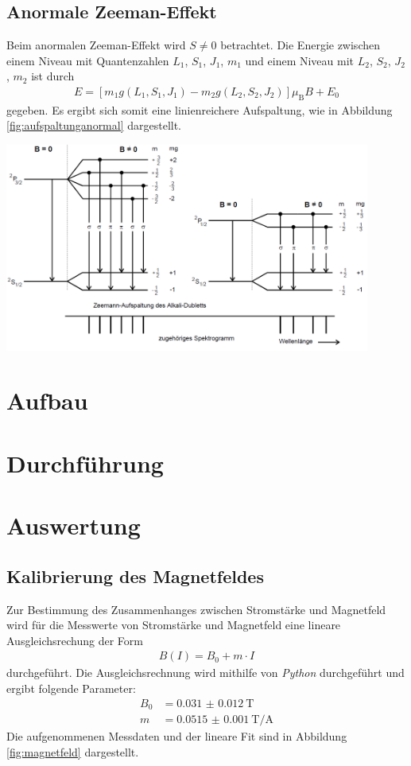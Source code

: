 \documentclass[captions=tableheading]{scrartcl}
\newcommand{\indx}[1]{\text{#1}}
\begin{document}
\subsection{Anormale Zeeman-Effekt}
Beim anormalen Zeeman-Effekt wird $S\neq 0$ betrachtet. 
Die Energie zwischen einem Niveau mit Quantenzahlen $L_1$, $S_1$, $J_1$, $m_1$ und einem Niveau mit $L_2$, $S_2$, $J_2$, $m_2$ ist durch 
\begin{align}
E=\left[ m_1 g\left(L_1,S_1,J_1 \right) - m_2 g\left(L_2,S_2,J_2 \right) \right] \mu_\indx{B}B+E_0
\end{align}
gegeben.
Es ergibt sich somit eine linienreichere Aufspaltung, wie in Abbildung \ref{fig:aufspaltunganormal} dargestellt.
\begin{center}
	\includegraphics[width=12cm]{images/aufspaltunganormal.png}
	\label{fig:aufspaltunganormal}
\end{center}
\section{Aufbau}


\section{Durchführung}


\section{Auswertung}

\subsection{Kalibrierung des Magnetfeldes}
Zur Bestimmung des Zusammenhanges zwischen Stromstärke und Magnetfeld wird für die Messwerte von Stromstärke und Magnetfeld eine lineare Ausgleichsrechung der Form
\begin{align}
B(I)=B_0+m\cdot I
\end{align}
durchgeführt. Die Ausgleichsrechnung wird mithilfe von \textit{Python} durchgeführt und ergibt folgende Parameter:
\begin{align*}
B_0&=\SI{0.031(12)}{\tesla} \\
m&=\SI{0.0515(10)}{\tesla\per\ampere}
\label{eq:parameter}
\end{align*}
Die aufgenommenen Messdaten und der lineare Fit sind in Abbildung \ref{fig:magnetfeld} dargestellt.
\end{document}
